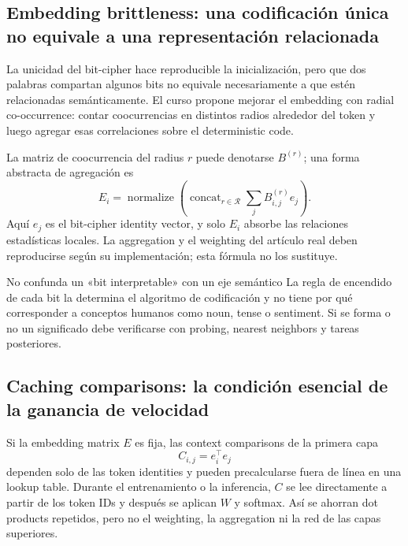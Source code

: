 \subsection{Embedding brittleness: una codificación única no equivale a una representación relacionada}

La unicidad del bit-cipher hace reproducible la inicialización, pero que dos palabras compartan algunos bits no equivale necesariamente a que estén relacionadas semánticamente. El curso propone mejorar el embedding con radial co-occurrence: contar coocurrencias en distintos radios alrededor del token y luego agregar esas correlaciones sobre el deterministic code.


La matriz de coocurrencia del radius $r$ puede denotarse $B^{(r)}$; una forma abstracta de agregación es
\[
E_i=\operatorname{normalize}\!\left(
\operatorname{concat}_{r\in\mathcal R}
\sum_j B^{(r)}_{i,j}e_j
\right).
\]
Aquí $e_j$ es el bit-cipher identity vector, y solo $E_i$ absorbe las relaciones estadísticas locales. La aggregation y el weighting del artículo real deben reproducirse según su implementación; esta fórmula no los sustituye.

\begin{warningbox}{No confunda un «bit interpretable» con un eje semántico}
La regla de encendido de cada bit la determina el algoritmo de codificación y no tiene por qué corresponder a conceptos humanos como noun, tense o sentiment. Si se forma o no un significado debe verificarse con probing, nearest neighbors y tareas posteriores.
\end{warningbox}


\subsection{Caching comparisons: la condición esencial de la ganancia de velocidad}

Si la embedding matrix $E$ es fija, las context comparisons de la primera capa
\[
C_{i,j}=e_i^\top e_j
\]
dependen solo de las token identities y pueden precalcularse fuera de línea en una lookup table. Durante el entrenamiento o la inferencia, $C$ se lee directamente a partir de los token IDs y después se aplican $W$ y softmax. Así se ahorran dot products repetidos, pero no el weighting, la aggregation ni la red de las capas superiores.

